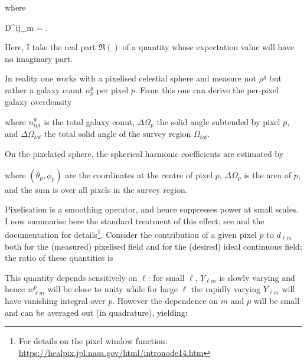\noindent where

 {
D^{ij}_{\ell m} = .
}

\noindent Here, I take the real part $\Re()$ of a quantity whose expectation value will have no imaginary part. 

\qquad In reality one works with a pixelised celestial sphere and measure not $\rho^g$ but rather a galaxy count $n^g_p$ per pixel $p$. From this one can derive the per-pixel galaxy overdensity


\noindent where $n^g_{tot}$ is the total galaxy count, $\Delta \Omega_p$ the solid angle subtended by pixel $p$, and $\Delta \Omega_{tot}$ the total solid angle of the survey region $\Omega_{tot}$.

\qquad On the pixelated sphere, the spherical harmonic coefficients are estimated by


\noindent where $(\theta_p,\phi_p)$ are the coordinates at the centre of pixel $p$, $\Delta\Omega_p$ is the area of $p$, and the sum is over all pixels in the survey region.

\qquad Pixelisation is a smoothing operator, and hence suppresses power at small scales. I now summarise here the standard treatment of this effect; see \cite{Healpix,Boris2013} and the \healpix documentation for details\footnote{For details on the pixel window function: \url{https://healpix.jpl.nasa.gov/html/intronode14.htm}}. Consider the contribution of a given pixel $p$ to $d_{\ell m}$ both for the (measured) pixelised field and for the (desired) ideal continuous field; the ratio of these quantities is 


\noindent This quantity depends sensitively on $\ell$: for small $\ell$, $Y_{\ell m}$ is slowly varying and hence $w_{\ell m}^p$ will be close to unity while for large $\ell$ the rapidly varying $Y_{\ell m}$ will have vanishing integral over $p$. However the dependence on $m$ and $p$ will be small and can be averaged out (in quadrature), yielding:


